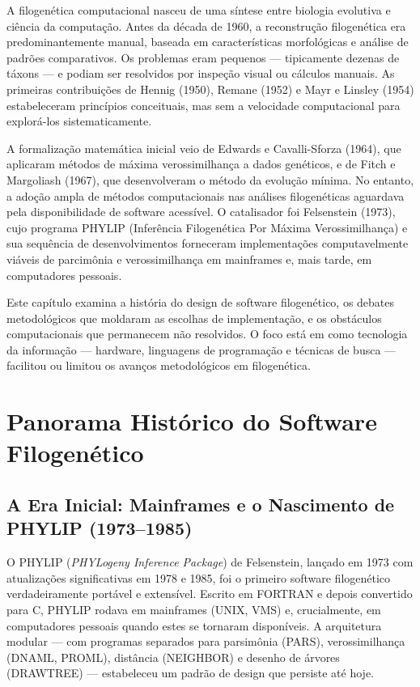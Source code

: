A filogenética computacional nasceu de uma síntese entre biologia evolutiva e ciência da computação. Antes da década de 1960, a reconstrução filogenética era predominantemente manual, baseada em características morfológicas e análise de padrões comparativos. Os problemas eram pequenos --- tipicamente dezenas de táxons --- e podiam ser resolvidos por inspeção visual ou cálculos manuais. As primeiras contribuições de Hennig (1950), Remane (1952) e Mayr e Linsley (1954) estabeleceram princípios conceituais, mas sem a velocidade computacional para explorá-los sistematicamente.

A formalização matemática inicial veio de Edwards e Cavalli-Sforza (1964), que aplicaram métodos de máxima verossimilhança a dados genéticos, e de Fitch e Margoliash (1967), que desenvolveram o método da evolução mínima. No entanto, a adoção ampla de métodos computacionais nas análises filogenéticas aguardava pela disponibilidade de software acessível. O catalisador foi Felsenstein (1973), cujo programa PHYLIP (Inferência Filogenética Por Máxima Verossimilhança) e sua sequência de desenvolvimentos forneceram implementações computavelmente viáveis de parcimônia e verossimilhança em mainframes e, mais tarde, em computadores pessoais.

Este capítulo examina a história do design de software filogenético, os debates metodológicos que moldaram as escolhas de implementação, e os obstáculos computacionais que permanecem não resolvidos. O foco está em como tecnologia da informação --- hardware, linguagens de programação e técnicas de busca --- facilitou ou limitou os avanços metodológicos em filogenética.

\section{Panorama Histórico do Software Filogenético}

\subsection{A Era Inicial: Mainframes e o Nascimento de PHYLIP (1973--1985)}

O PHYLIP (\textit{PHYLogeny Inference Package}) de Felsenstein, lançado em 1973 com atualizações significativas em 1978 e 1985, foi o primeiro software filogenético verdadeiramente portável e extensível. Escrito em FORTRAN e depois convertido para C, PHYLIP rodava em mainframes (UNIX, VMS) e, crucialmente, em computadores pessoais quando estes se tornaram disponíveis. A arquitetura modular --- com programas separados para parsimônia (PARS), verossimilhança (DNAML, PROML), distância (NEIGHBOR) e desenho de árvores (DRAWTREE) --- estabeleceu um padrão de design que persiste até hoje.

